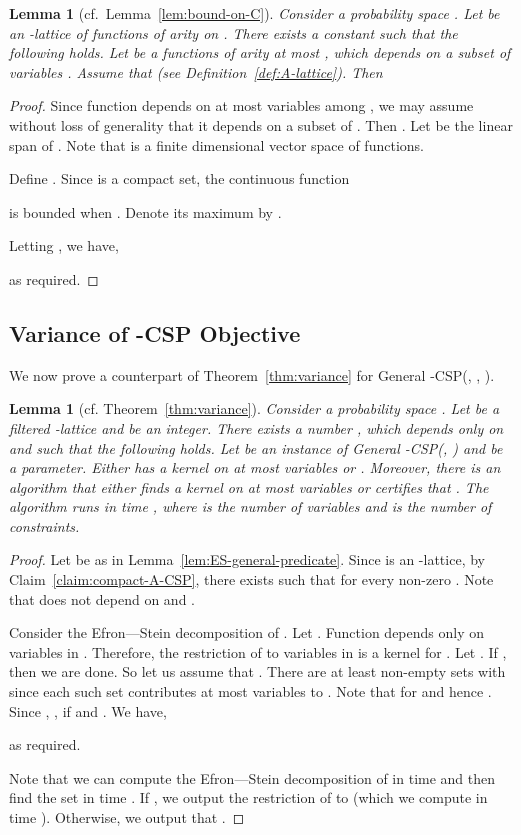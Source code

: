 \documentclass[11pt]{article}
\newtheorem{lemma}[theorem]{Lemma}
\begin{document}
\begin{lemma}[cf.~Lemma~\ref{lem:bound-on-C}]\label{lem:bound-on-C-A-CSP}
Consider a probability space . Let   be an -lattice of functions of arity  on .
There exists a constant  such that the following holds. Let  be a functions of arity at most , which
depends on a subset of variables . Assume that  (see Definition~\ref{def:A-lattice}). Then

\end{lemma}
\begin{proof}
Since function  depends on at most  variables among , we may assume without loss of generality
that it depends on a subset of . Then .
Let  be the linear span of .
Note that  is a finite dimensional vector space of functions.

Define . Since  is
a compact set, the continuous
function

is  bounded when . Denote its maximum by .

Letting , we have,

as required.
\end{proof}

\subsection{Variance of -CSP Objective}
We now prove a counterpart of Theorem~\ref{thm:variance} for General -CSP(, , ).
\begin{lemma}[cf. Theorem~\ref{thm:variance}]\label{lem:variance-A-CSP}
Consider a probability space . Let   be a filtered -lattice and  be an integer.
There exists a number , which depends only on  and  such that the following holds.
Let  be an instance of General -CSP(, ) and   be a parameter.
Either  has a kernel on at most  variables or . Moreover,
there is an algorithm that either finds a kernel on at most  variables or certifies that
. The algorithm runs in time , where  is the number of variables and  is the number of constraints.
\end{lemma}
\begin{proof}
Let  be as in Lemma~\ref{lem:ES-general-predicate}. Since  is an -lattice, by Claim~\ref{claim:compact-A-CSP},
there exists  such that  for every non-zero .
Note that  does not depend on  and .

Consider the Efron---Stein decomposition of . Let .
Function  depends only on variables in . Therefore, the restriction of  to variables in  is a kernel for . Let .
If , then we are done. So let us assume that .
There are at least  non-empty sets  with  since each such set  contributes at most  variables to .
Note that  for  and hence . Since ,
, if  and . We have,

as required.

Note that we can compute the Efron---Stein decomposition of  in time  and then find the set  in time . If , we output the restriction of  to  (which we compute in time ). Otherwise, we output that .
\end{proof}
\end{document}
